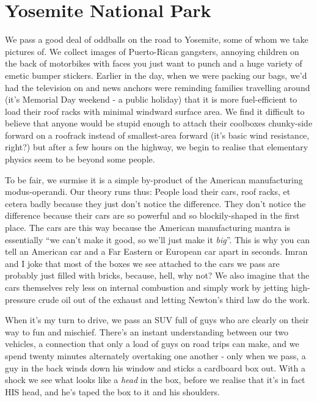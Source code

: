 \documentclass[a5paper,titlepage,11pt,draft]{book}
\begin{document}
\section*{Yosemite National Park}
We pass a good deal of oddballs on the road to Yosemite, some of whom we take pictures of.  We collect images of Puerto-Rican gangsters, annoying children on the back of motorbikes with faces you just want to punch and a huge variety of emetic bumper stickers.  Earlier in the day, when we were packing our bags, we'd had the television on and news anchors were reminding families travelling around (it's Memorial Day weekend - a public holiday) that it is more fuel-efficient to load their roof racks with minimal windward surface area.  We find it difficult to believe that anyone would be stupid enough to attach their coolboxes chunky-side forward on a roofrack instead of smallest-area forward (it's basic wind resistance, right?) but after a few hours on the highway, we begin to realise that elementary physics seem to be beyond some people.

To be fair, we surmise it is a simple by-product of the American manufacturing modus-operandi.  Our theory runs thus:  People load their cars, roof racks, et cetera badly because they just don't notice the difference.  They don't notice the difference because their cars are so powerful and so blockily-shaped in the first place.  The cars are this way because the American manufacturing mantra is essentially ``we can't make it good, so we'll just make it \emph{big}''.  This is why you can tell an American car and a Far Eastern or European car apart in seconds.  Imran and I joke that most of the boxes we see attached to the cars we pass are probably just filled with bricks, because, hell, why not?  We also imagine that the cars themselves rely less on internal combustion and simply work by jetting high-pressure crude oil out of the exhaust and letting Newton's third law do the work.

When it's my turn to drive, we pass an SUV full of guys who are clearly on their way to fun and mischief.  There's an instant understanding between our two vehicles, a connection that only a load of guys on road trips can make, and we spend twenty minutes alternately overtaking one another - only when we pass, a guy in the back winds down his window and sticks a cardboard box out.  With a shock we see what looks like a \emph{head} in the box, before we realise that it's in fact HIS head, and he's taped the box to it and his shoulders.
\end{document}

